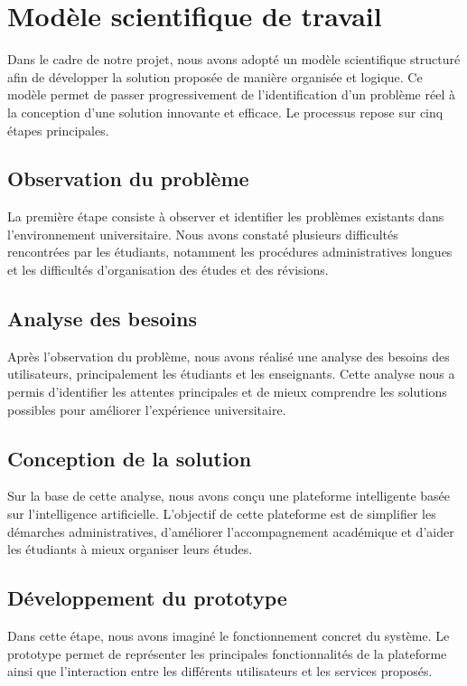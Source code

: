 \documentclass[12pt,a4paper]{report}
\begin{document}
\chapter{Modèle scientifique de travail}
Dans le cadre de notre projet, nous avons adopté un modèle scientifique structuré afin de développer la solution proposée de manière organisée et logique. Ce modèle permet de passer progressivement de l'identification d'un problème réel à la conception d'une solution innovante et efficace. Le processus repose sur cinq étapes principales.

\section{Observation du problème}
La première étape consiste à observer et identifier les problèmes existants dans l'environnement universitaire. Nous avons constaté plusieurs difficultés rencontrées par les étudiants, notamment les procédures administratives longues et les difficultés d'organisation des études et des révisions.

\section{Analyse des besoins}
Après l'observation du problème, nous avons réalisé une analyse des besoins des utilisateurs, principalement les étudiants et les enseignants. Cette analyse nous a permis d'identifier les attentes principales et de mieux comprendre les solutions possibles pour améliorer l'expérience universitaire.

\section{Conception de la solution}
Sur la base de cette analyse, nous avons conçu une plateforme intelligente basée sur l'intelligence artificielle. L'objectif de cette plateforme est de simplifier les démarches administratives, d'améliorer l'accompagnement académique et d'aider les étudiants à mieux organiser leurs études.

\section{Développement du prototype}
Dans cette étape, nous avons imaginé le fonctionnement concret du système. Le prototype permet de représenter les principales fonctionnalités de la plateforme ainsi que l'interaction entre les différents utilisateurs et les services proposés.
\end{document}

